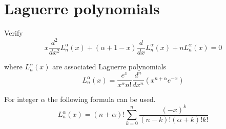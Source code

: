 

\section*{Laguerre polynomials}

Verify
\begin{equation*}
x\frac{d^2}{dx^2}L_n^\alpha(x)+(\alpha+1-x)\frac{d}{dx}L_n^\alpha(x)+nL_n^\alpha(x)=0
\end{equation*}

where $L_n^\alpha(x)$ are associated Laguerre polynomials
\begin{equation*}
L_n^\alpha(x)=\frac{e^x}{x^\alpha n!}\frac{d^n}{dx^n}(x^{n+\alpha}e^{-x})
\end{equation*}

For integer $\alpha$ the following formula can be used.
\begin{equation*}
L_n^\alpha(x)=(n+\alpha)!\sum_{k=0}^n\frac{(-x)^k}{(n-k)!(\alpha+k)!k!}
\end{equation*}


